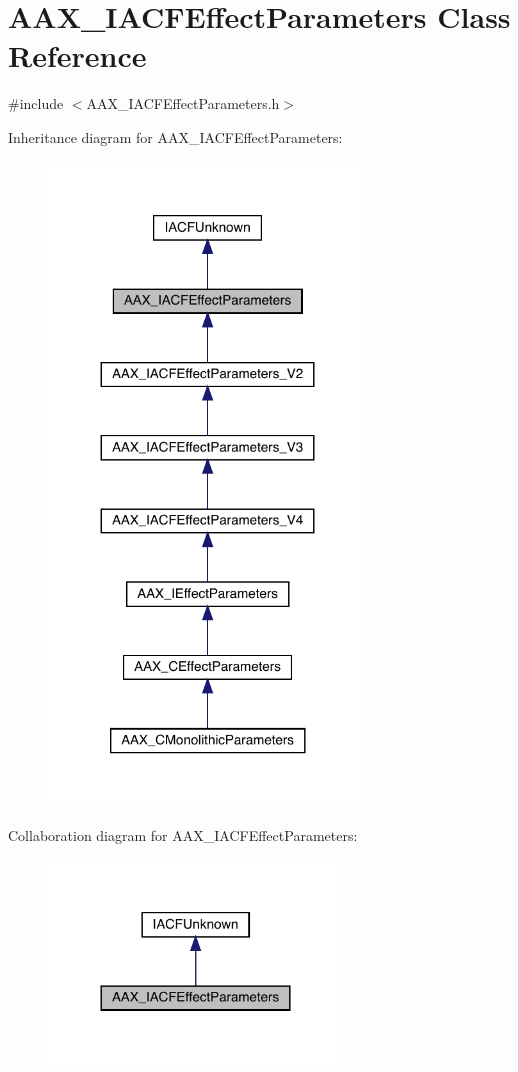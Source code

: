 \hypertarget{a01669}{}\section{A\+A\+X\+\_\+\+I\+A\+C\+F\+Effect\+Parameters Class Reference}
\label{a01669}


{\ttfamily \#include $<$A\+A\+X\+\_\+\+I\+A\+C\+F\+Effect\+Parameters.\+h$>$}



Inheritance diagram for A\+A\+X\+\_\+\+I\+A\+C\+F\+Effect\+Parameters\+:
\nopagebreak
\begin{figure}[H]
\begin{center}
\leavevmode
\includegraphics[width=239pt]{a01668}
\end{center}
\end{figure}


Collaboration diagram for A\+A\+X\+\_\+\+I\+A\+C\+F\+Effect\+Parameters\+:
\nopagebreak
\begin{figure}[H]
\begin{center}
\leavevmode
\includegraphics[width=221pt]{a01667}
\end{center}
\end{figure}


